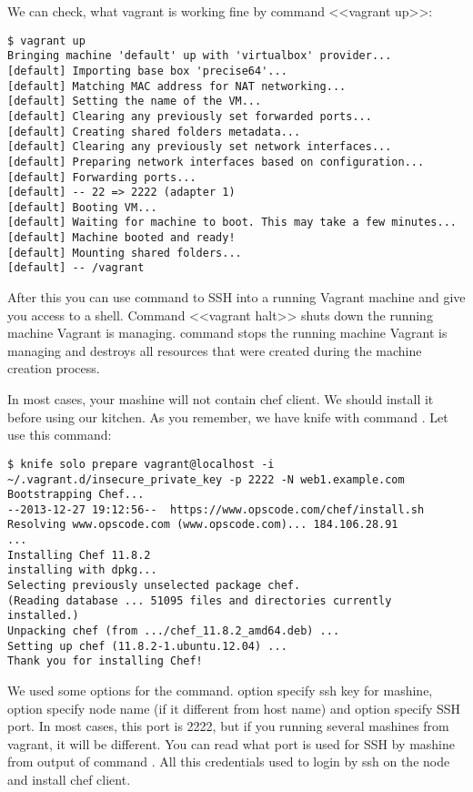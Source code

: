 We can check, what vagrant is working fine by command <<vagrant up>>:

\begin{lstlisting}[label=lst:my-cloud-vagrant4]
$ vagrant up
Bringing machine 'default' up with 'virtualbox' provider...
[default] Importing base box 'precise64'...
[default] Matching MAC address for NAT networking...
[default] Setting the name of the VM...
[default] Clearing any previously set forwarded ports...
[default] Creating shared folders metadata...
[default] Clearing any previously set network interfaces...
[default] Preparing network interfaces based on configuration...
[default] Forwarding ports...
[default] -- 22 => 2222 (adapter 1)
[default] Booting VM...
[default] Waiting for machine to boot. This may take a few minutes...
[default] Machine booted and ready!
[default] Mounting shared folders...
[default] -- /vagrant
\end{lstlisting}

After this you can use command  to SSH into a running Vagrant machine and give you access to a shell. Command <<vagrant halt>> shuts down the running machine Vagrant is managing.  command stops the running machine Vagrant is managing and destroys all resources that were created during the machine creation process.

In most cases, your mashine will not contain chef client. We should install it before using our kitchen. As you remember, we have knife with command . Let use this command:

\begin{lstlisting}[label=lst:my-cloud-vagrant5]
$ knife solo prepare vagrant@localhost -i ~/.vagrant.d/insecure_private_key -p 2222 -N web1.example.com
Bootstrapping Chef...
--2013-12-27 19:12:56--  https://www.opscode.com/chef/install.sh
Resolving www.opscode.com (www.opscode.com)... 184.106.28.91
...
Installing Chef 11.8.2
installing with dpkg...
Selecting previously unselected package chef.
(Reading database ... 51095 files and directories currently installed.)
Unpacking chef (from .../chef_11.8.2_amd64.deb) ...
Setting up chef (11.8.2-1.ubuntu.12.04) ...
Thank you for installing Chef!
\end{lstlisting}

We used some options for the  command.  option specify ssh key for mashine,  option specify node name (if it different from host name) and  option specify SSH port. In most cases, this port is 2222, but if you running several mashines from vagrant, it will be different. You can read what port is used for SSH by mashine from output of command . All this credentials used to login by ssh on the node and install chef client.

